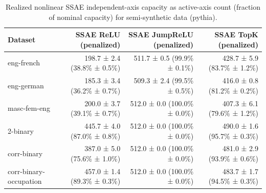 \begin{table}[t]
\centering
\caption{Realized nonlinear SSAE independent-axis capacity as active-axis count (fraction of nominal capacity) for semi-synthetic data (pythia).}
\label{tab:semisynthetic-pythia-realized-active-axis-capacity}
\begin{tabular}{lrrr}
\toprule
Dataset & SSAE ReLU (penalized) & SSAE JumpReLU (penalized) & SSAE TopK (penalized) \\
\midrule
eng-french & 198.7 ± 2.4 (38.8\% ± 0.5\%) & 511.7 ± 0.5 (99.9\% ± 0.1\%) & 428.7 ± 5.9 (83.7\% ± 1.2\%) \\
eng-german & 185.3 ± 3.4 (36.2\% ± 0.7\%) & 509.3 ± 2.4 (99.5\% ± 0.5\%) & 416.0 ± 0.8 (81.2\% ± 0.2\%) \\
masc-fem-eng & 200.0 ± 3.7 (39.1\% ± 0.7\%) & 512.0 ± 0.0 (100.0\% ± 0.0\%) & 407.3 ± 6.1 (79.6\% ± 1.2\%) \\
2-binary & 445.7 ± 4.0 (87.0\% ± 0.8\%) & 512.0 ± 0.0 (100.0\% ± 0.0\%) & 490.0 ± 1.6 (95.7\% ± 0.3\%) \\
corr-binary & 387.0 ± 5.0 (75.6\% ± 1.0\%) & 512.0 ± 0.0 (100.0\% ± 0.0\%) & 481.0 ± 2.9 (93.9\% ± 0.6\%) \\
corr-binary-occupation & 457.0 ± 1.4 (89.3\% ± 0.3\%) & 512.0 ± 0.0 (100.0\% ± 0.0\%) & 483.7 ± 1.7 (94.5\% ± 0.3\%) \\
\bottomrule
\end{tabular}
\end{table}
